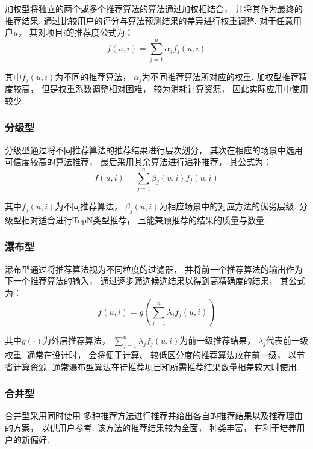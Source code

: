 加权型将独立的两个或多个推荐算法的算法通过加权相结合，
并将其作为最终的推荐结果.
通过比较用户的评分与算法预测结果的差异进行权重调整.
对于任意用户$u$，
其对项目$i$的推荐度公式为：
\begin{equation}
    f(u,i)=\sum_{j=1}^n\alpha_j f_j(u,i)
\end{equation}

其中$f_j(u,i)$为不同的推荐算法，
$\alpha_j$为不同推荐算法所对应的权重.
加权型推荐精度较高，
但是权重系数调整相对困难，
较为消耗计算资源，
因此实际应用中使用较少.

\subsubsection{分级型}

分级型通过将不同推荐算法的推荐结果进行层次划分，
其次在相应的场景中选用可信度较高的算法推荐，
最后采用其余算法进行递补推荐，
其公式为：
\begin{equation}
    f(u,i)=\sum_{j=1}^n\beta_j(u,i)f_j(u,i)
\end{equation}

其中$f_j(u,i)$为不同推荐算法，
$\beta_j(u,i)$为相应场景中的对应方法的优劣层级.
分级型相对适合进行TopN类型推荐，
且能兼顾推荐的结果的质量与数量.

\subsubsection{瀑布型}

瀑布型通过将推荐算法视为不同粒度的过滤器，
并将前一个推荐算法的输出作为下一个推荐算法的输入，
通过逐步筛选候选结果以得到高精确度的结果，
其公式为：
\begin{equation}
    f(u,i)=g\left(\sum_{j=1}^n\lambda_j f_j(u,i)\right)
\end{equation}

其中$g(\cdot)$为外层推荐算法，
$\sum_{j=1}^n\lambda_j f_j(u,i)$为前一级推荐结果，
$\lambda_j$代表前一级权重.
通常在设计时，
会将便于计算、
较低区分度的推荐算法放在前一级，
以节省计算资源.
通常瀑布型算法在待推荐项目和所需推荐结果数量相差较大时使用.

\subsubsection{合并型}

合并型采用同时使用
多种推荐方法进行推荐并给出各自的推荐结果以及推荐理由
的方案，
以供用户参考.
该方法的推荐结果较为全面，
种类丰富，
有利于培养用户的新偏好.


